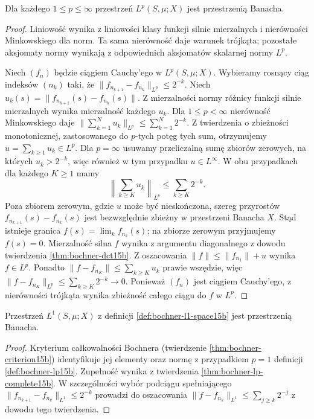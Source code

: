 \begin{twierdzenie}
\label{thm:bochner-lp-complete15b}
Dla każdego $1\le p\le\infty$ przestrzeń
$L^p(S,\mu;X)$ jest przestrzenią Banacha.
\end{twierdzenie}
\begin{proof}
Liniowość wynika z liniowości klasy funkcji silnie
mierzalnych i nierówności Minkowskiego dla norm.
Ta sama nierówność daje warunek trójkąta;
pozostałe aksjomaty normy wynikają z odpowiednich
aksjomatów skalarnej normy $L^p$.

Niech $(f_n)$ będzie ciągiem Cauchy'ego w $L^p(S,\mu;X)$.
Wybieramy rosnący ciąg indeksów $(n_k)$ taki, że
$\|f_{n_{k+1}}-f_{n_k}\|_{L^p}\le2^{-k}$.
Niech $u_k(s)=\|f_{n_{k+1}}(s)-f_{n_k}(s)\|$.
Z mierzalności normy różnicy funkcji silnie mierzalnych
wynika mierzalność każdego $u_k$.
Dla $1\le p<\infty$ nierówność Minkowskiego daje
$\|\sum_{k=1}^N u_k\|_{L^p}\le\sum_{k=1}^N2^{-k}$.
Z twierdzenia o zbieżności monotonicznej, zastosowanego
do $p$-tych potęg tych sum, otrzymujemy
$u=\sum_{k\ge1}u_k\in L^p$.
Dla $p=\infty$ usuwamy przeliczalną sumę zbiorów
zerowych, na których $u_k>2^{-k}$, więc również
w tym przypadku $u\in L^\infty$.
W obu przypadkach dla każdego $K\ge1$ mamy
\[
 \left\|\sum_{k\ge K}u_k\right\|_{L^p}
 \le\sum_{k\ge K}2^{-k}.
\]
Poza zbiorem zerowym, gdzie $u$ może być nieskończona,
szereg przyrostów $f_{n_{k+1}}(s)-f_{n_k}(s)$ jest
bezwzględnie zbieżny w przestrzeni Banacha $X$.
Stąd istnieje granica $f(s)=\lim_k f_{n_k}(s)$;
na zbiorze zerowym przyjmujemy $f(s)=0$.
Mierzalność silna $f$ wynika z argumentu diagonalnego
z dowodu twierdzenia \ref{thm:bochner-dct15b}.
Z oszacowania $\|f\|\le\|f_{n_1}\|+u$ wynika $f\in L^p$.
Ponadto $\|f-f_{n_K}\|\le\sum_{k\ge K}u_k$
prawie wszędzie, więc
$\|f-f_{n_K}\|_{L^p}\le\sum_{k\ge K}2^{-k}\to0$.
Ponieważ $(f_n)$ jest ciągiem Cauchy'ego, z nierówności
trójkąta wynika zbieżność całego ciągu do $f$ w $L^p$.
\end{proof}

\begin{wniosek}
\label{cor:bochner-l1-complete15b}
Przestrzeń $L^1(S,\mu;X)$ z definicji
\ref{def:bochner-l1-space15b} jest przestrzenią Banacha.
\end{wniosek}
\begin{proof}
Kryterium całkowalności Bochnera
(twierdzenie \ref{thm:bochner-criterion15b})
identyfikuje jej elementy oraz normę z przypadkiem
$p=1$ definicji \ref{def:bochner-lp15b}.
Zupełność wynika z twierdzenia
\ref{thm:bochner-lp-complete15b}.
W szczególności wybór podciągu spełniającego
$\|f_{n_{k+1}}-f_{n_k}\|_{L^1}\le 2^{-k}$
prowadzi do oszacowania
$\|f-f_{n_k}\|_{L^1}\le\sum_{j\ge k}2^{-j}$
z dowodu tego twierdzenia.
\end{proof}

